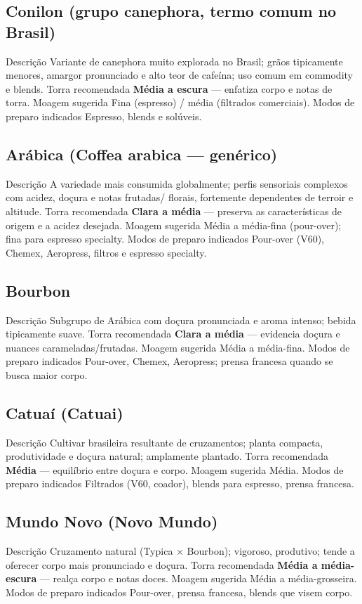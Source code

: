 \documentclass[a4paper,12pt]{article}
\begin{document}
\subsection{Conilon (grupo canephora, termo comum no Brasil)}
{Descrição} Variante de canephora muito explorada no Brasil; grãos tipicamente menores, amargor pronunciado e alto teor de cafeína; uso comum em commodity e blends.  
{Torra recomendada} \textbf{Média a escura} — enfatiza corpo e notas de torra.  
{Moagem sugerida} Fina (espresso) / média (filtrados comerciais).  
{Modos de preparo indicados} Espresso, blends e solúveis.

\subsection{Arábica (Coffea arabica — genérico)}
{Descrição} A variedade mais consumida globalmente; perfis sensoriais complexos com acidez, doçura e notas frutadas/ florais, fortemente dependentes de terroir e altitude.  
{Torra recomendada} \textbf{Clara a média} — preserva as características de origem e a acidez desejada.  
{Moagem sugerida} Média a média-fina (pour-over); fina para espresso specialty.  
{Modos de preparo indicados} Pour-over (V60), Chemex, Aeropress, filtros e espresso specialty.

\subsection{Bourbon}
{Descrição} Subgrupo de Arábica com doçura pronunciada e aroma intenso; bebida tipicamente suave.  
{Torra recomendada} \textbf{Clara a média} — evidencia doçura e nuances carameladas/frutadas.  
{Moagem sugerida} Média a média-fina.  
{Modos de preparo indicados} Pour-over, Chemex, Aeropress; prensa francesa quando se busca maior corpo.

\subsection{Catuaí (Catuai)}
{Descrição} Cultivar brasileira resultante de cruzamentos; planta compacta, produtividade e doçura natural; amplamente plantado.  
{Torra recomendada} \textbf{Média} — equilíbrio entre doçura e corpo.  
{Moagem sugerida} Média.  
{Modos de preparo indicados} Filtrados (V60, coador), blends para espresso, prensa francesa.

\subsection{Mundo Novo (Novo Mundo)}
{Descrição} Cruzamento natural (Typica × Bourbon); vigoroso, produtivo; tende a oferecer corpo mais pronunciado e doçura.  
{Torra recomendada} \textbf{Média a média-escura} — realça corpo e notas doces.  
{Moagem sugerida} Média a média-grosseira.  
{Modos de preparo indicados} Pour-over, prensa francesa, blends que visem corpo.
\end{document}
